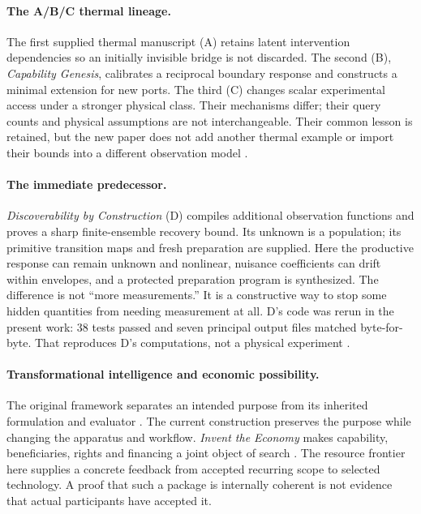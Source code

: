 \documentclass[11pt,letterpaper]{article}
\theoremstyle{definition}\newtheorem{definition}[theorem]{Definition}
\theoremstyle{remark}\newtheorem{remark}[theorem]{Remark}
\begin{document}
\paragraph{The A/B/C thermal lineage.}
The first supplied thermal manuscript (A) retains latent intervention dependencies so an initially invisible bridge is not discarded. The second (B), \emph{Capability Genesis}, calibrates a reciprocal boundary response and constructs a minimal extension for new ports. The third (C) changes scalar experimental access under a stronger physical class. Their mechanisms differ; their query counts and physical assumptions are not interchangeable. Their common lesson is retained, but the new paper does not add another thermal example or import their bounds into a different observation model \cite{boucherABC}.

\paragraph{The immediate predecessor.}
\emph{Discoverability by Construction} (D) compiles additional observation functions and proves a sharp finite-ensemble recovery bound. Its unknown is a population; its primitive transition maps and fresh preparation are supplied. Here the productive response can remain unknown and nonlinear, nuisance coefficients can drift within envelopes, and a protected preparation program is synthesized. The difference is not ``more measurements.'' It is a constructive way to stop some hidden quantities from needing measurement at all. D's code was rerun in the present work: 38 tests passed and seven principal output files matched byte-for-byte. That reproduces D's computations, not a physical experiment \cite{boucherD}.

\paragraph{Transformational intelligence and economic possibility.}
The original framework separates an intended purpose from its inherited formulation and evaluator \cite{boucherTI}. The current construction preserves the purpose while changing the apparatus and workflow. \emph{Invent the Economy} makes capability, beneficiaries, rights and financing a joint object of search \cite{boucherEconomy}. The resource frontier here supplies a concrete feedback from accepted recurring scope to selected technology. A proof that such a package is internally coherent is not evidence that actual participants have accepted it.
\end{document}
